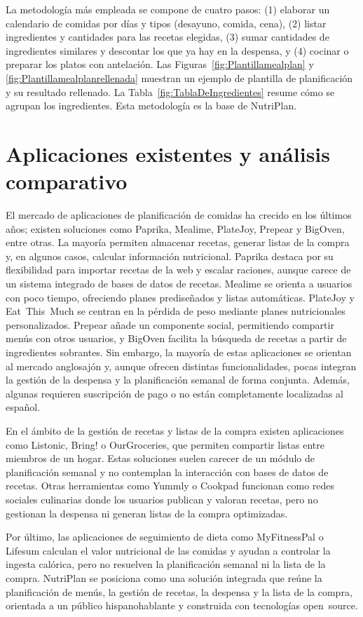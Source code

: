 \documentclass[twoside, openright, 11pt]{report}
\begin{document}
La metodología más empleada se compone de cuatro pasos: (1) elaborar un calendario de comidas por días y tipos (desayuno, comida, cena), (2) listar ingredientes y cantidades para las recetas elegidas, (3) sumar cantidades de ingredientes similares y descontar los que ya hay en la despensa, y (4) cocinar o preparar los platos con antelación. Las Figuras~\ref{fig:Plantillamealplan} y \ref{fig:Plantillamealplanrellenada} muestran un ejemplo de plantilla de planificación y su resultado rellenado. La Tabla~\ref{fig:TablaDeIngredientes} resume cómo se agrupan los ingredientes. Esta metodología es la base de NutriPlan.

\section{Aplicaciones existentes y análisis comparativo}
El mercado de aplicaciones de planificación de comidas ha crecido en los últimos años; existen soluciones como Paprika, Mealime, PlateJoy, Prepear y BigOven, entre otras. La mayoría permiten almacenar recetas, generar listas de la compra y, en algunos casos, calcular información nutricional. Paprika destaca por su flexibilidad para importar recetas de la web y escalar raciones, aunque carece de un sistema integrado de bases de datos de recetas. Mealime se orienta a usuarios con poco tiempo, ofreciendo planes prediseñados y listas automáticas. PlateJoy y Eat This Much se centran en la pérdida de peso mediante planes nutricionales personalizados. Prepear añade un componente social, permitiendo compartir menús con otros usuarios, y BigOven facilita la búsqueda de recetas a partir de ingredientes sobrantes. Sin embargo, la mayoría de estas aplicaciones se orientan al mercado anglosajón y, aunque ofrecen distintas funcionalidades, pocas integran la gestión de la despensa y la planificación semanal de forma conjunta. Además, algunas requieren suscripción de pago o no están completamente localizadas al español.

En el ámbito de la gestión de recetas y listas de la compra existen aplicaciones como Listonic, Bring! o OurGroceries, que permiten compartir listas entre miembros de un hogar. Estas soluciones suelen carecer de un módulo de planificación semanal y no contemplan la interacción con bases de datos de recetas. Otras herramientas como Yummly o Cookpad funcionan como redes sociales culinarias donde los usuarios publican y valoran recetas, pero no gestionan la despensa ni generan listas de la compra optimizadas.

Por último, las aplicaciones de seguimiento de dieta como MyFitnessPal o Lifesum calculan el valor nutricional de las comidas y ayudan a controlar la ingesta calórica, pero no resuelven la planificación semanal ni la lista de la compra. NutriPlan se posiciona como una solución integrada que reúne la planificación de menús, la gestión de recetas, la despensa y la lista de la compra, orientada a un público hispanohablante y construida con tecnologías open source.
\end{document}
